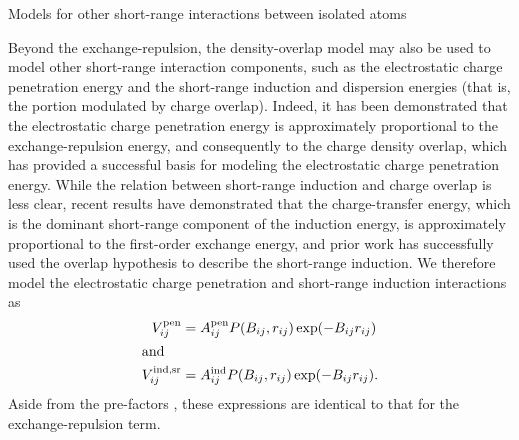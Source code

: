 \begin{subsection}{Models for other short-range interactions between isolated atoms}
\label{sec:isotropic-heteroatomic_vsr}

Beyond the exchange-repulsion, the density-overlap model may also be used
to model other short-range interaction components, such as the electrostatic
charge penetration energy and the short-range induction and dispersion
energies (that is, the portion modulated by charge overlap).  Indeed, it has 
been demonstrated that the electrostatic charge penetration energy is
approximately proportional to the exchange-repulsion energy, and consequently
to the charge density overlap,
\cite{Stone2007,Misquitta2014}
which has provided a successful basis for modeling the electrostatic charge
penetration energy.
\cite{McDaniel2013,Totton2010}
While the relation between short-range induction and charge overlap
is less clear, 
recent results have demonstrated that the charge-transfer energy, which is the
dominant short-range component of the induction energy,\cite{Misquitta2013} is
approximately proportional to the first-order exchange energy,
\cite{Misquitta2015a,Misquitta2015b}
and prior work has successfully used the overlap hypothesis to
describe the short-range induction.
\cite{Stone2007,Totton2010,McDaniel2013}
We therefore model the electrostatic charge penetration and short-range 
induction interactions as
\begin{align}
V^{\text{pen}}_{ij} &= A^{\text{pen}}_{ij} P(B_{ij}, r_{ij}) \exp(-B_{ij}r_{ij}) \\
\intertext{and}
V^{\text{ind,sr}}_{ij} &= A^{\text{ind}}_{ij} P(B_{ij}, r_{ij}) \exp(-B_{ij}r_{ij}).
\end{align}
%
Aside from the pre-factors \A, these expressions are
identical to that for the exchange-repulsion term.


\end{subsection}
